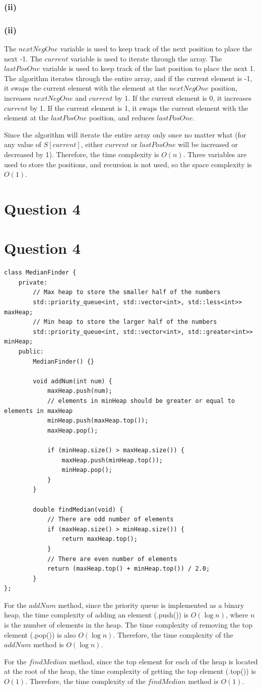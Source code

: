 \documentclass{article}
\newcommand{\mysectionstar}[2][]{%
    \ifthenelse{\equal{#1}{}}%
        {\section*{#2}}%
        {\section*[#1]{#2}}%
    \outline{1}{#2}%
}
\newcommand{\mysubsubsectionstar}[2][]{%
    \ifthenelse{\equal{#1}{}}%
        {\subsubsection*{#2}}%
        {\subsubsection*[#1]{#2}}%
    \outline{2}{#2}%
}
\begin{document}
\mysubsubsectionstar{(ii)}

The $nextNegOne$ variable is used to keep track of the next position to place the next -1. The $current$ variable is used to iterate through the array. The $lastPosOne$ variable is used to keep track of the last position to place the next 1. The algorithm iterates through the entire array, and if the current element is -1, it swaps the current element with the element at the $nextNegOne$ position, increases $nextNegOne$ and $current$ by 1. If the current element is 0, it increases $current$ by 1. If the current element is 1, it swaps the current element with the element at the $lastPosOne$ position, and reduces $lastPosOne$.

Since the algorithm will iterate the entire array only once no matter what (for any value of $S[current]$, either $current$ or $lastPosOne$ will be increased or decreased by 1). Therefore, the time complexity is $O(n)$. Three variables are used to store the positions, and recursion is not used, so the space complexity is $O(1)$.

\mysectionstar{Question 4}

\begin{verbatim}
class MedianFinder {
    private:
        // Max heap to store the smaller half of the numbers
        std::priority_queue<int, std::vector<int>, std::less<int>> maxHeap;
        // Min heap to store the larger half of the numbers
        std::priority_queue<int, std::vector<int>, std::greater<int>> minHeap;
    public:
        MedianFinder() {}
        
        void addNum(int num) {
            maxHeap.push(num);
            // elements in minHeap should be greater or equal to elements in maxHeap
            minHeap.push(maxHeap.top());
            maxHeap.pop();

            if (minHeap.size() > maxHeap.size()) {
                maxHeap.push(minHeap.top());
                minHeap.pop();
            }
        }
        
        double findMedian(void) {
            // There are odd number of elements
            if (maxHeap.size() > minHeap.size()) {
                return maxHeap.top();
            }
            // There are even number of elements
            return (maxHeap.top() + minHeap.top()) / 2.0;
        }
};
\end{verbatim}

For the $addNum$ method, since the priority queue is implemented as a binary heap, the time complexity of adding an element (.push()) is $O(\log n)$, where $n$ is the number of elements in the heap. The time complexity of removing the top element (.pop()) is also $O(\log n)$. Therefore, the time complexity of the $addNum$ method is $O(\log n)$.

For the $findMedian$ method, since the top element for each of the heap is located at the root of the heap, the time complexity of getting the top element (.top()) is $O(1)$. Therefore, the time complexity of the $findMedian$ method is $O(1)$.
\end{document}
